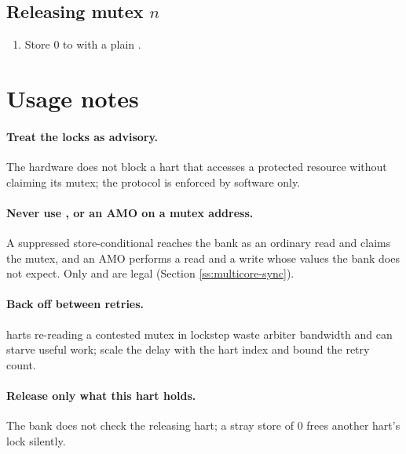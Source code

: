 \subsection{Releasing mutex $n$}

\begin{enumerate}
	\item Store 0 to  with a plain .
\end{enumerate}

\section{Usage notes}

\paragraph{Treat the locks as advisory.} The hardware does not block a hart that accesses a protected resource without claiming its mutex; the protocol is enforced by software only.

\paragraph{Never use ,  or an AMO on a mutex address.} A suppressed store-conditional reaches the bank as an ordinary read and claims the mutex, and an AMO performs a read and a write whose values the bank does not expect. Only  and  are legal (Section \ref{ss:multicore-sync}).

\paragraph{Back off between retries.} \NumHartsWord{} harts re-reading a contested mutex in lockstep waste arbiter bandwidth and can starve useful work; scale the delay with the hart index and bound the retry count.

\paragraph{Release only what this hart holds.} The bank does not check the releasing hart; a stray store of 0 frees another hart's lock silently.
